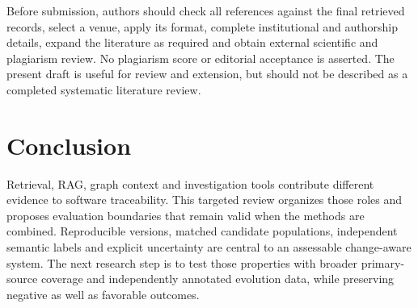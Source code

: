 \documentclass[conference,a4paper]{IEEEtran}
\begin{document}
Before submission, authors should check all references against the final retrieved records, select a venue, apply its format, complete institutional and authorship details, expand the literature as required and obtain external scientific and plagiarism review. No plagiarism score or editorial acceptance is asserted. The present draft is useful for review and extension, but should not be described as a completed systematic literature review.

\balance
\section{Conclusion}
Retrieval, RAG, graph context and investigation tools contribute different evidence to software traceability. This targeted review organizes those roles and proposes evaluation boundaries that remain valid when the methods are combined. Reproducible versions, matched candidate populations, independent semantic labels and explicit uncertainty are central to an assessable change-aware system. The next research step is to test those properties with broader primary-source coverage and independently annotated evolution data, while preserving negative as well as favorable outcomes.
\end{document}
